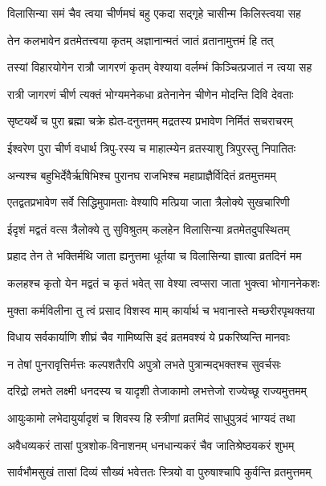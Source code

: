 \twolineshloka
{विलासिन्या समं चैव त्वया चीर्णमघं बहु}
{एकदा सद्गृहे चासीन्म किलिस्त्वया सह} %

\twolineshloka
{तेन कलभावेन व्रतमेतत्त्वया कृतम्}
{अज्ञानान्मतं जातं व्रतानामुत्तमं हि तत्} %

\twolineshloka
{तस्यां विहारयोगेन रात्रौ जागरणं कृतम्}
{वेश्याया वर्लम्भं किञ्चित्प्रजातं न त्वया सह} %

\twolineshloka
{रात्री जागरणं चीर्ण त्यक्तं भोग्यमनेकधा}
{व्रतेनानेन चीणेन मोदन्ति दिवि देवताः} %

\twolineshloka
{सृष्टयर्थे च पुरा ब्रह्मा चक्रे ह्येत-दनुत्तमम्}
{मद्रतस्य प्रभावेण निर्मितं सचराचरम्} %

\twolineshloka
{ईश्वरेण पुरा चीर्ण वधार्थ त्रिपु-रस्य च}
{माहात्म्येन व्रतस्याशु त्रिपुरस्तु निपातितः} %

\twolineshloka
{अन्यश्च बहुभिर्देवैर्ऋषिभिश्च पुरानघ}
{राजभिश्च महाप्राज्ञैर्विदितं व्रतमुत्तमम्} %

\twolineshloka
{एतद्वतप्रभावेण सर्वे सिद्धिमुपामताः}
{वेश्यापि मत्प्रिया जाता त्रैलोक्ये सुखचारिणी} %

\twolineshloka
{ईदृशं मद्वतं वत्स त्रैलोक्ये तु सुविश्रुतम्}
{कलहेन विलासिन्या व्रतमेतदुपस्थितम्} %

\twolineshloka
{प्रहाद तेन ते भक्तिर्मथि जाता ह्यनुत्तमा}
{धूर्तया च विलासिन्या ज्ञात्वा व्रतदिनं मम} %

\twolineshloka
{कलहश्च कृतो येन मद्वतं च कृतं भवेत्}
{सा वेश्या त्वप्सरा जाता भुक्त्वा भोगाननेकशः} %

\twolineshloka
{मुक्ता कर्मविलीना तु त्वं प्रसाद विशस्व माम्}
{कार्यार्थ च भवानास्ते मच्छरीरपृथक्तया} %

\twolineshloka
{विधाय सर्वकार्याणि शीघ्रं चैव गामिष्यसि}
{इदं व्रतमवश्यं ये प्रकरिष्यन्ति मानवाः} %

\twolineshloka
{न तेषां पुनरावृत्तिर्मत्तः कल्पशतैरपि}
{अपुत्रो लभते पुत्रान्मद्भक्तश्च सुवर्चसः} %

\twolineshloka
{दरिद्रो लभते लक्ष्मी धनदस्य च यादृशी}
{तेजाकामो लभत्तेजो राज्येच्छू राज्यमुत्तमम्} %

\twolineshloka
{आयुःकामो लभेदायुर्यादृशं च शिवस्य हि}
{स्त्रीणां व्रतमिदं साधुपुत्रदं भाग्यदं तथा} %

\twolineshloka
{अवैधव्यकरं तासां पुत्रशोक-विनाशनम्}
{धनधान्यकरं चैव जातिश्रेष्ठयकरं शुभम्} %

\twolineshloka
{सार्वभौमसुखं तासां दिव्यं सौख्यं भवेत्ततः}
{स्त्रियो वा पुरुषाश्चापि कुर्वन्ति व्रतमुत्तमम्} %

